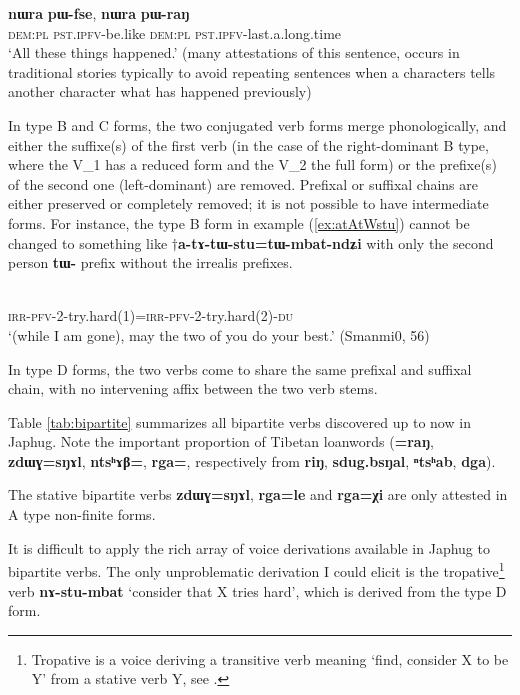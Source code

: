 \documentclass[11pt]{article}
\newcommand{\ipa}[1]{{\phon\textbf{#1}}}
\newcommand{\jpg}[2]{\ipa{#1} `#2'}
\newcommand{\refb}[1]{(\ref{#1})}
\begin{document}
\begin{exe}
\ex \label{ex:fse.rang}
\gll 
\ipa{nɯra} \ipa{pɯ-fse}, \ipa{nɯra} \ipa{pɯ-raŋ} \\
\textsc{dem:pl} \textsc{pst.ipfv}-be.like \textsc{dem:pl} \textsc{pst.ipfv}-last.a.long.time \\ 
\glt `All these things happened.' (many attestations of this sentence, occurs in traditional stories typically to avoid repeating sentences when a characters tells another character what has happened previously)
\end{exe}

In type B and C forms, the two conjugated verb forms merge phonologically, and either the suffixe(s) of the first verb (in the case of the right-dominant B type, where the V_1 has a reduced form and the V_2 the full form) or the prefixe(s) of the second one (left-dominant) are removed. Prefixal or suffixal chains are either preserved or completely removed; it is not possible to have intermediate forms. For instance, the type B form in example \refb{ex:atAtWstu} cannot be changed to something like $\dagger$\ipa{a-tɤ-tɯ-stu=tɯ-mbat-ndʑi} with only the second person \ipa{tɯ-} prefix without the irrealis prefixes.

\begin{exe}
\ex \label{ex:atAtWstu}
\gll \ipa{a-tɤ-tɯ-stu=a-tɤ-tɯ-mbat-ndʑi} \\
\textsc{irr-pfv-2}-try.hard(1)=\textsc{irr-pfv-2}-try.hard(2)-\textsc{du} \\
\glt `(while I am gone),  may the two of you do your best.' (Smanmi0, 56)
\end{exe}

In type D forms, the two verbs come to share the same prefixal and suffixal chain, with no intervening affix between the two verb stems.

Table \ref{tab:bipartite} summarizes all bipartite verbs discovered up to now in Japhug. Note the important proportion of Tibetan loanwords (\ipa{=raŋ}, \ipa{zdɯɣ=sŋɤl}, \ipa{ntsʰɤβ=}, \ipa{rga=}, respectively from \ipa{riŋ}, \ipa{sdug.bsŋal}, \ipa{ⁿtsʰab}, \ipa{dga}).

The stative bipartite verbs \ipa{zdɯɣ=sŋɤl}, \ipa{rga=le} and \ipa{rga=χi} are only attested in A type  non-finite forms. 

It is difficult to apply the rich array of voice derivations available in Japhug to bipartite verbs. The only unproblematic derivation I could elicit is the tropative\footnote{Tropative is a voice deriving a transitive verb meaning `find, consider X to be Y' from a stative verb Y, see \citet{jacques13tropative}.} verb \jpg{nɤ-stu-mbat}{consider that X tries hard}, which is derived from the type D form.
\end{document}
